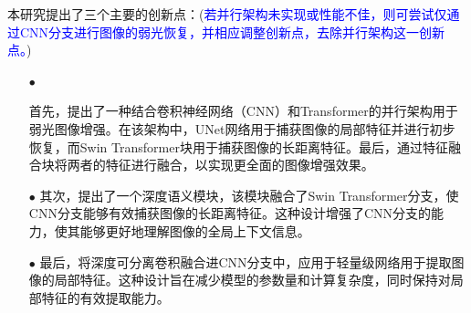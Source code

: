 \documentclass[a4paper]{ctexart}
\begin{document}
		
		
		
		本研究提出了三个主要的创新点：(\textcolor{blue}{若并行架构未实现或性能不佳，则可尝试仅通过CNN分支进行图像的弱光恢复，并相应调整创新点，去除并行架构这一创新点。})
		\begin{itemize}
			\item[$\bullet$]
			
			首先，提出了一种结合卷积神经网络（CNN）和Transformer的并行架构用于弱光图像增强。在该架构中，UNet网络用于捕获图像的局部特征并进行初步恢复，而Swin Transformer块用于捕获图像的长距离特征。最后，通过特征融合块将两者的特征进行融合，以实现更全面的图像增强效果。
			\item[$\bullet$] 
			其次，提出了一个深度语义模块，该模块融合了Swin Transformer分支，使CNN分支能够有效捕获图像的长距离特征。这种设计增强了CNN分支的能力，使其能够更好地理解图像的全局上下文信息。
			\item[$\bullet$]
			最后，将深度可分离卷积融合进CNN分支中，应用于轻量级网络用于提取图像的局部特征。这种设计旨在减少模型的参数量和计算复杂度，同时保持对局部特征的有效提取能力。
		\end{itemize}
		
\end{document}
